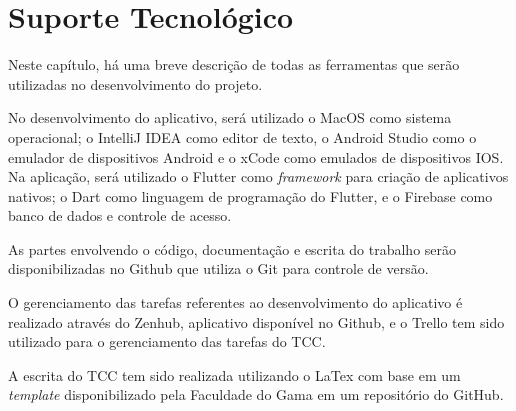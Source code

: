 \chapter[Suporte Tecnológico]{Suporte Tecnológico}
\label{ch:suporte}

Neste capítulo, há uma breve descrição de todas as ferramentas que serão 
utilizadas no desenvolvimento do projeto. 

No desenvolvimento do aplicativo, será utilizado o MacOS como sistema 
operacional; o IntelliJ IDEA como editor de texto, o Android Studio como 
o emulador de dispositivos Android e o xCode como emulados de dispositivos IOS. 
Na aplicação, será utilizado o Flutter 
como \emph{framework} para criação de aplicativos nativos; o Dart como linguagem 
de programação do Flutter, e o Firebase como banco de dados e controle de acesso. 

As partes envolvendo o código, documentação e escrita do trabalho serão disponibilizadas 
no Github que utiliza o Git para controle de versão.

O gerenciamento das tarefas referentes ao desenvolvimento do aplicativo é realizado através do Zenhub, 
aplicativo disponível no Github, 
e o Trello tem sido utilizado para o gerenciamento das tarefas do TCC. 

A escrita do TCC tem sido realizada utilizando o LaTex com base em um \emph{template} 
disponibilizado pela Faculdade do Gama em um repositório do GitHub. 

